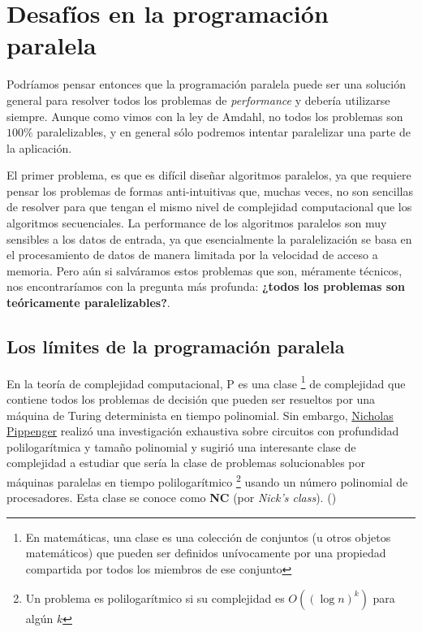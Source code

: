 \section*{Desafíos en la programación paralela}

Podríamos pensar entonces que la programación paralela puede ser una solución general para resolver todos los problemas
de \textit{performance} y debería utilizarse siempre. Aunque como vimos con la ley de Amdahl, no todos los problemas son
$100\%$ paralelizables, y en general sólo podremos intentar paralelizar una parte de la aplicación.

El primer problema, es que es difícil diseñar algoritmos paralelos, ya que requiere pensar los problemas de formas
anti-intuitivas que, muchas veces, no son sencillas de resolver para que tengan el mismo nivel de complejidad
computacional que los algoritmos secuenciales. La performance de los algoritmos paralelos son muy sensibles a los datos
de entrada, ya que esencialmente la paralelización se basa en el procesamiento de datos de manera limitada por la
velocidad de acceso a memoria. Pero aún si salváramos estos problemas que son, méramente técnicos, nos encontraríamos
con la pregunta más profunda: \textbf{¿todos los problemas son teóricamente paralelizables?}.

\subsection*{Los límites de la programación paralela}

En la teoría de complejidad computacional, P es una clase \footnote{En matemáticas, una clase es una colección de
conjuntos (u otros objetos matemáticos) que pueden ser definidos unívocamente por una propiedad compartida por todos los
miembros de ese conjunto} de complejidad que contiene todos los problemas de decisión que pueden ser resueltos por una
máquina de Turing determinista en tiempo polinomial. Sin embargo,
\href{https://en.wikipedia.org/wiki/Nick_Pippenger}{Nicholas Pippenger} realizó una investigación exhaustiva sobre
circuitos con profundidad polilogarítmica y tamaño polinomial y sugirió una interesante clase de complejidad a estudiar
que sería la clase de problemas solucionables por máquinas paralelas en tiempo polilogarítmico \footnote{Un problema es
polilogarítmico si su complejidad es $O((\log n)^k)$ para algún $k$} usando un número polinomial de procesadores. Esta
clase se conoce como \textbf{NC} (por \textit{Nick's class}). (\textcite{stockmeyer1987})

